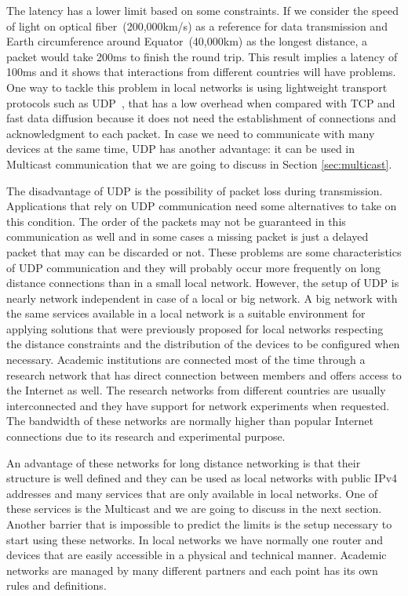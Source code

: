The latency has a lower limit based on some constraints.
If we consider the speed of light on optical fiber~(200,000km/s) as a reference for data transmission and Earth circumference around Equator~(40,000km) as the longest distance, a packet would take 200ms to finish the round trip.
This result implies a latency of 100ms and it shows that interactions from different countries will have problems.
One way to tackle this problem in local networks is using lightweight transport protocols such as UDP~\citep{Harker2008laptop,Caceres2010jacktrip}, that has a low overhead when compared with TCP and fast data diffusion because it does not need the establishment of connections and acknowledgment to each packet.
In case we need to communicate with many devices at the same time, UDP has another advantage: it can be used in Multicast communication that we are going to discuss in Section \ref{sec:multicast}.   

The disadvantage of UDP is the possibility of packet loss during transmission.
Applications that rely on UDP communication need some alternatives to take on this condition.
The order of the packets may not be guaranteed in this communication as well and in some cases a missing packet is just a delayed packet that may can be discarded or not.
These problems are some characteristics of UDP communication and they will probably occur more frequently on long distance connections than in a small local network.
However, the setup of UDP is nearly network independent in case of a local or big network.
A big network with the same services available in a local network is a suitable environment for applying solutions that were previously proposed for local networks respecting the distance constraints and the distribution of the devices to be configured when necessary.
Academic institutions are connected most of the time through a research network that has direct connection between members and offers access to the Internet as well.
The research networks from different countries are usually interconnected and they have support for network experiments when requested.
The bandwidth of these networks are normally higher than popular Internet connections due to its research and experimental purpose.

An advantage of these networks for long distance networking is that their structure is well defined and they can be used as local networks with public IPv4 addresses and many services that are only available in local networks.
One of these services is the Multicast and we are going to discuss in the next section.
Another barrier that is impossible to predict the limits is the setup necessary to start using these networks.
In local networks we have normally one router and devices that are easily accessible in a physical and technical manner.
Academic networks are managed by many different partners and each point has its own rules and definitions.

